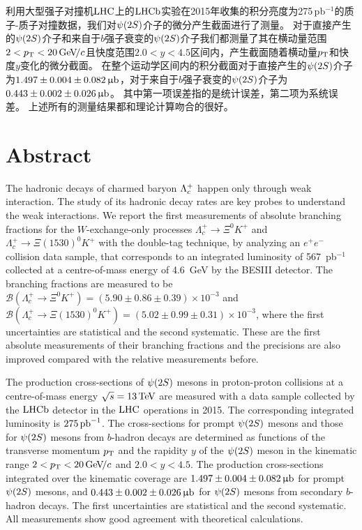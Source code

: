 利用大型强子对撞机$\mbox{LHC}$上的$\mbox{LHCb}$实验在2015年收集的积分亮度为275\,pb$^{-1}$的质子-质子对撞数据，我们对${\psi{(2S)}}$介子的微分产生截面进行了测量。
对于直接产生的${\psi{(2S)}}$介子和来自于$b$强子衰变的${\psi{(2S)}}$介子我们都测量了其在横动量范围$2<\mbox{$p_{\mathrm{ T}}$}<20{\mathrm{\,Ge\kern -0.1em V\!/}c}$且快度范围$2.0<y<4.5$区间内，产生截面随着横动量$\mbox{$p_{\mathrm{ T}}$}$和快度$y$变化的微分截面。
在整个运动学区间内的积分截面对于直接产生的${\psi{(2S)}}$介子为$1.497\pm0.004\pm0.082{\mathrm{ \,\upmu b}}$，对于来自于$b$强子衰变的${\psi{(2S)}}$介子为$0.443\pm0.002\pm0.026{\mathrm{ \,\upmu b}}$。
其中第一项误差指的是统计误差，第二项为系统误差。
上述所有的测量结果都和理论计算吻合的很好。

\chapter*{Abstract}%

The hadronic decays of charmed baryon $\Lambda_{c}^{+}$ happen only through weak interaction.
The study of its hadronic decay rates are key probes to understand the weak interactions.
We report the first measurements of absolute branching fractions for the $W$-exchange-only processes $\Lambda^+_c\to\Xi^0K^+$ and $\Lambda^+_c\to\Xi(1530)^0K^+$ with the double-tag technique, by analyzing an $e^{+}e^{-}$ collision data sample, that corresponds to an integrated luminosity of 567~pb$^{-1}$ collected at a centre-of-mass energy of 4.6~GeV by the BESIII detector.
The branching fractions are measured to be $\mathcal{B}(\Lambda^+_c\to\Xi^0K^+)=(5.90\pm0.86\pm0.39)\times10^{-3}$ and $\mathcal{B}(\Lambda^+_c\to\Xi(1530)^0K^+)=(5.02\pm0.99\pm0.31)\times10^{-3}$, where the first uncertainties are statistical and the second systematic.
These are the first absolute measurements of their branching fractions and the precisions are also improved compared with the relative measurements before.

The production cross-sections of ${\psi{(2S)}}$ mesons in proton-proton collisions at a centre-of-mass energy $\protect\sqrt{s}=13\mathrm{\,Te\kern -0.1em V}$ are measured with a data sample collected by the $\mbox{LHCb}$ detector in the $\mbox{LHC}$ operations in 2015. 
The corresponding integrated luminosity is $275\mbox{\,pb}^{-1}$.
 The cross-sections for prompt ${\psi{(2S)}}$ mesons and those for ${\psi{(2S)}}$ mesons from $b$-hadron decays are determined as functions of the transverse momentum $\mbox{$p_{\mathrm{ T}}$}$ and the rapidity $y$ of the ${\psi{(2S)}}$ meson in the kinematic range $2<\mbox{$p_{\mathrm{ T}}$}<20{\mathrm{\,Ge\kern -0.1em V\!/}c}$ and $2.0<y<4.5$.
The production cross-sections integrated over the kinematic coverage are 
$1.497\pm0.004\pm0.082{\mathrm{ \,\upmu b}}$ 
for prompt ${\psi{(2S)}}$ mesons, and 
$0.443\pm0.002\pm0.026{\mathrm{ \,\upmu b}}$
for ${\psi{(2S)}}$ mesons from secondary $b$-hadron decays.
The first uncertainties are statistical and the second systematic.
All measurements show good agreement with theoretical calculations.


